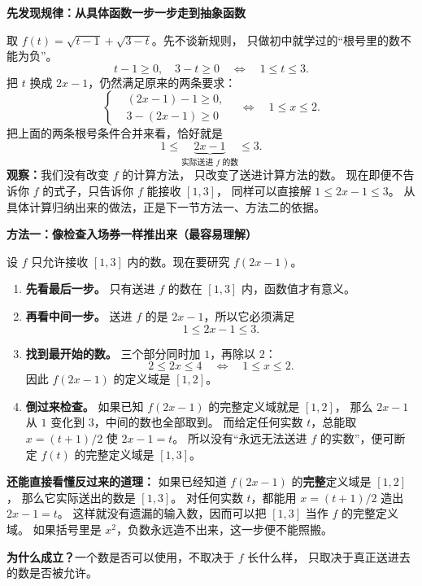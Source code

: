 \clearpage
\begin{proofbox}
\textbf{\textcolor{CProof}{先发现规律：从具体函数一步一步走到抽象函数}}

取 $f(t)=\sqrt{t-1}+\sqrt{3-t}$。先不谈新规则，
只做初中就学过的“根号里的数不能为负”。
\[
 t-1\ge0,\quad3-t\ge0
 \quad\Longleftrightarrow\quad1\le t\le3.
\]
把 $t$ 换成 $2x-1$，仍然满足原来的两条要求：
\[
\left\{\begin{aligned}
 &(2x-1)-1\ge0,\\
 &3-(2x-1)\ge0
\end{aligned}\right.
\quad\Longleftrightarrow\quad 1\le x\le2.
\]
把上面的两条根号条件合并来看，恰好就是
\[
 1\le \underbrace{2x-1}_{\text{实际送进 }f\text{ 的数}}\le3.
\]
\textbf{观察：}我们没有改变 $f$ 的计算方法，
只改变了送进计算方法的数。
现在即便不告诉你 $f$ 的式子，只告诉你 $f$ 能接收 $[1,3]$，
同样可以直接解 $1\le2x-1\le3$。
从具体计算归纳出来的做法，正是下一节方法一、方法二的依据。

\medskip

\textbf{\textcolor{CProof}{方法一：像检查入场券一样推出来（最容易理解）}}
\begin{center}\end{center}


设 $f$ 只允许接收 $[1,3]$ 内的数。现在要研究 $f(2x-1)$。

\begin{enumerate}[leftmargin=*,itemsep=0.42em]
 \item \textbf{先看最后一步。} 只有送进 $f$ 的数在 $[1,3]$ 内，函数值才有意义。
 \item \textbf{再看中间一步。} 送进 $f$ 的是 $2x-1$，所以它必须满足
 \[
 1\le2x-1\le3.
 \]
 \item \textbf{找到最开始的数。} 三个部分同时加 $1$，再除以 $2$：
 \[
 2\le2x\le4\quad\Longleftrightarrow\quad1\le x\le2.
 \]
 因此 $f(2x-1)$ 的定义域是 $[1,2]$。
 \item \textbf{倒过来检查。} 如果已知 $f(2x-1)$ 的完整定义域就是 $[1,2]$，
 那么 $2x-1$ 从 $1$ 变化到 $3$，中间的数也全部取到。
 而给定任何实数 $t$，总能取 $x=(t+1)/2$ 使 $2x-1=t$。
 所以没有“永远无法送进 $f$ 的实数”，便可断定 $f(t)$ 的完整定义域是 $[1,3]$。
\end{enumerate}

\textbf{还能直接看懂反过来的道理：}
如果已经知道 $f(2x-1)$ 的\textbf{完整}定义域是 $[1,2]$，
那么它实际送出的数是 $[1,3]$。
对任何实数 $t$，都能用 $x=(t+1)/2$ 造出 $2x-1=t$。
这样就没有遗漏的输入数，因而可以把 $[1,3]$ 当作 $f$ 的完整定义域。
如果括号里是 $x^2$，负数永远造不出来，这一步便不能照搬。

\medskip

\textbf{为什么成立？}\quad 一个数是否可以使用，不取决于 $f$ 长什么样，
只取决于真正送进去的数是否被允许。

\medskip
\end{proofbox}
